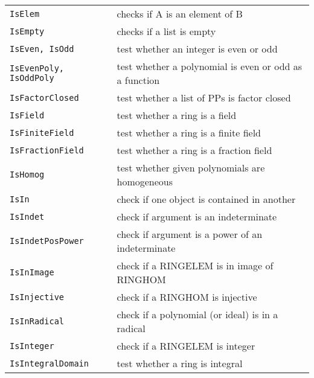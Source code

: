 \documentclass[a4paper]{mybook}
\begin{document}
\begin{center}
\begin{longtable}{ll}
{\verb~IsElem~} &
      checks if A is an element of B\\
   
{\verb~IsEmpty~} &
      checks if a list is empty\\
   
{\verb~IsEven, IsOdd~} &
      test whether an integer is even or odd\\
   
{\verb~IsEvenPoly, IsOddPoly~} &
      test whether a polynomial is even or odd as a function\\
   
{\verb~IsFactorClosed~} &
      test whether a list of PPs is factor closed\\
   
{\verb~IsField~} &
      test whether a ring is a field\\
   
{\verb~IsFiniteField~} &
      test whether a ring is a finite field\\
   
{\verb~IsFractionField~} &
      test whether a ring is a fraction field\\
   
{\verb~IsHomog~} &
      test whether given polynomials are homogeneous\\
   
{\verb~IsIn~} &
      check if one object is contained in another\\
   
{\verb~IsIndet~} &
      check if argument is an indeterminate\\
   
{\verb~IsIndetPosPower~} &
      check if argument is a power of an indeterminate\\
   
{\verb~IsInImage~} &
      check if a RINGELEM is in image of RINGHOM\\
   
{\verb~IsInjective~} &
      check if a RINGHOM is injective\\
   
{\verb~IsInRadical~} &
      check if a polynomial (or ideal) is in a radical\\
   
{\verb~IsInteger~} &
      check if a RINGELEM is integer\\
   
{\verb~IsIntegralDomain~} &
      test whether a ring is integral\\
   

\end{longtable}
\end{center}
\end{document}
